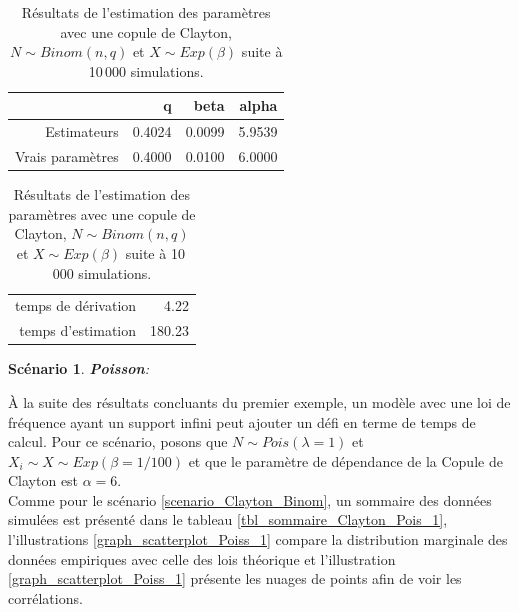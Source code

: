 \documentclass{article}
\newtheorem{Scenario}{Scénario}
\begin{document}
		\begin{table}[H]
			\centering
			\begin{tabular}{rrrr}
				\hline
				& q & beta & alpha \\ 
				\hline
				Estimateurs & 0.4024 & 0.0099 & 5.9539 \\ 
				Vrais paramètres & 0.4000 & 0.0100 & 6.0000 \\ 
				\hline
			\end{tabular}
			\begin{tabular}{rr}
				\hline
				&  \\ 
				\hline
				temps de dérivation & 4.22 \\ 
				temps d'estimation & 180.23 \\ 
				\hline
			\end{tabular}
			\caption[Estimations avec une copule de Clayton et $N\sim Binomiale$]{Résultats de l'estimation des paramètres avec une copule de Clayton, $N\sim Binom(n,q)$ et $X \sim Exp(\beta)$ suite à 10\,000 simulations.} 
			\label{tbl_Clayton_Binom}
		\end{table}
		
		\begin{Scenario}\label{scenario_Clayton_Pois}
			\textbf{Poisson}:
		\end{Scenario}
	
		À la suite des résultats concluants du premier exemple, un modèle avec une loi de fréquence ayant un support infini peut ajouter un défi en terme de temps de calcul. Pour ce scénario, posons que $N \sim Pois(\lambda=1)$ et $X_i \sim X \sim Exp(\beta=1/100)$ et que le paramètre de dépendance de la Copule de Clayton est $\alpha = 6$. \\
		
		Comme pour le scénario \ref{scenario_Clayton_Binom}, un sommaire des données simulées est présenté dans le tableau \ref{tbl_sommaire_Clayton_Pois_1}, l'illustrations \ref{graph_scatterplot_Poiss_1} compare la distribution marginale des données empiriques avec celle des lois théorique et l'illustration \ref{graph_scatterplot_Poiss_1} présente les nuages de points afin de voir les corrélations.
		
\end{document}
